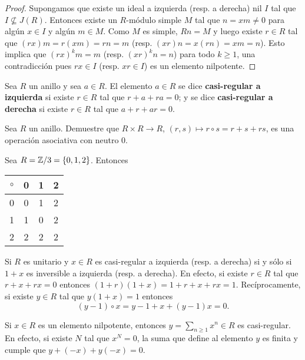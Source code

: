 \begin{proof}
	Supongamos que existe un ideal a izquierda (resp. a derecha) nil $I$ tal que
	$I\not\subseteq J(R)$. Entonces existe un $R$-módulo simple $M$ tal que
	$n=xm\ne 0$ para algún $x\in I$ y algún $m\in M$. Como $M$ es simple,
	$Rn=M$ y luego existe $r\in R$ tal que $(rx)m=r(xm)=rn=m$ (resp.
	$(xr)n=x(rn)=xm=n$). Esto implica que $(rx)^km=m$ (resp. $(xr)^kn=n$) para
	todo $k\geq1$, una contradicción pues $rx\in I$ (resp. $xr\in I$) es un
	elemento nilpotente. 
\end{proof}


\begin{definition}
	Sea $R$ un anillo y sea $a\in R$. El elemento $a\in R$ se dice
	\textbf{casi-regular a izquierda} si existe $r\in R$ tal que $r+a+ra=0$; y
	se dice \textbf{casi-regular a derecha} si existe $r\in R$ tal que $a+r+ar=0$. 
\end{definition}

\begin{exercise}
	\label{exercise:circ}
	Sea $R$ un anillo. Demuestre que $R\times R\to R$,
	$(r,s)\mapsto r\circ s=r+s+rs$, es una operación asociativa con neutro $0$.
\end{exercise}

\begin{example}
	Sea $R=\mathbb{Z}/3=\{0,1,2\}$. Entonces
	\begin{table}
		\centering
		\begin{tabular}{c|ccc}
			$\circ$ & 0 & 1 & 2\tabularnewline
			\hline
			0 & 0 & 1 & 2\tabularnewline
			1 & 1 & 0 & 2\tabularnewline
			2 & 2 & 2 & 2\tabularnewline
		\end{tabular}
	\end{table}
\end{example}

\begin{remark}
	\label{remark:eq1inR}
	Si $R$ es unitario y $x\in R$ es casi-regular a izquierda (resp. a derecha)
	si y sólo si $1+x$ es inversible a izquierda (resp. a derecha). En efecto,
	si existe $r\in R$ tal que $r+x+rx=0$ entonces $(1+r)(1+x)=1+r+x+rx=1$.
	Recíprocamente, si existe $y\in R$ tal que $y(1+x)=1$ entonces 
	\[
	(y-1)\circ x=y-1+x+(y-1)x=0.
	\]
\end{remark}

\begin{example}
	Si $x\in R$ es un elemento nilpotente, entonces $y=\sum_{n\geq1}x^n\in R$
	es casi-regular. En efecto, si existe $N$ tal que $x^N=0$, la suma que
	define al elemento $y$ es finita y cumple que $y+(-x)+y(-x)=0$.  
\end{example}

